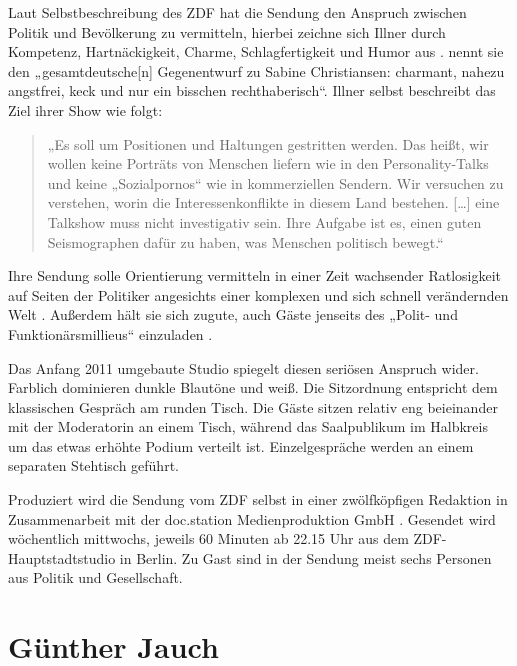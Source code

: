 Laut Selbstbeschreibung des ZDF hat die Sendung den Anspruch zwischen Politik und Bevölkerung zu vermitteln, hierbei zeichne sich Illner durch Kompetenz, Hartnäckigkeit, Charme, Schlagfertigkeit und Humor aus \parencite{maybritillnerMaybritIllnerGesicht2007}. \textcite{keilBerlinerSalon2011} nennt sie den „gesamtdeutsche[n] Gegenentwurf zu Sabine Christiansen: charmant, nahezu angstfrei, keck und nur ein bisschen rechthaberisch“. Illner selbst beschreibt das Ziel ihrer Show wie folgt:

\begin{quote}
	„Es soll um Positionen und Haltungen gestritten werden. Das heißt, wir wollen keine Porträts von Menschen liefern wie in den Personality-Talks und keine „Sozialpornos“ wie in kommerziellen Sendern. Wir versuchen zu verstehen, worin die Interessenkonflikte in diesem Land bestehen. [\ldots] eine Talkshow muss nicht investigativ sein. Ihre Aufgabe ist es, einen guten Seismographen dafür zu haben, was Menschen politisch bewegt.“ \parencite{keilIchBinNicht2011}
\end{quote}

Ihre Sendung solle Orientierung vermitteln in einer Zeit wachsender Ratlosigkeit auf Seiten der Politiker angesichts einer komplexen und sich schnell verändernden Welt \parencite{keilIchBinNicht2011}. Außerdem hält sie sich zugute, auch Gäste jenseits des „Polit- und Funktionärsmillieus“ einzuladen \parencite{brostMaybritIllnerWir2011}.

Das Anfang 2011 umgebaute Studio spiegelt diesen seriösen Anspruch wider. Farblich dominieren dunkle Blautöne und weiß. Die Sitzordnung entspricht dem klassischen Gespräch am runden Tisch. Die Gäste sitzen relativ eng beieinander mit der Moderatorin an einem Tisch, während das Saalpublikum im Halbkreis um das etwas erhöhte Podium verteilt ist. Einzelgespräche werden an einem separaten Stehtisch geführt.

Produziert wird die Sendung vom ZDF selbst in einer zwölfköpfigen Redaktion in Zusammenarbeit mit der doc.station Medienproduktion GmbH \parencite[101]{zweitesdeutschesfernsehenZDFJahrbuch20112012}. Gesendet wird wöchentlich mittwochs, jeweils 60 Minuten ab 22.15 Uhr aus dem ZDF-Hauptstadtstudio in Berlin. Zu Gast sind in der Sendung meist sechs Personen aus Politik und Gesellschaft.

\section{Günther Jauch}

